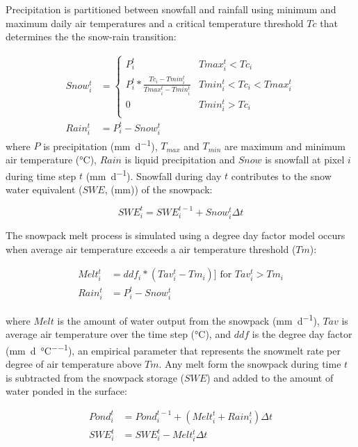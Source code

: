 Precipitation is partitioned between snowfall and rainfall using minimum and maximum daily air temperatures and a critical temperature threshold $Tc$ that determines the the snow-rain transition:

\begin{align}
Snow_i^t &= \left\{
        \begin{array}{ll}
        P_i^t &  Tmax_i^t < Tc_i \\  
        P_i^t * \frac{Tc_i - Tmin_i^t}{Tmax_i^t - Tmin_i^t} & Tmin_i^t < Tc_i < Tmax_i^t \\
        0 &  Tmin_i^t > Tc_i \\
        \end{array}
\right.\\
Rain_i^t &= P_i^t - Snow_i^t     
\end{align}
\noindent where $P$ is precipitation (\si{\milli\metre\per\day}), $T_{max}$ and $T_{min}$ are maximum and minimum air temperature (\si{\degreeCelsius}), $Rain$ is liquid precipitation and $Snow$ is snowfall at pixel $i$ during time step $t$ (\si{\milli\metre\per\day}). Snowfall during day $t$ contributes to the snow water equivalent ($SWE$, (\si{\milli\metre})) of the snowpack:

\begin{equation}
SWE_i^t = SWE_i^{t-1} + Snow_i^t \Delta t
\end{equation}

The snowpack melt process is simulated using a degree day factor model occurs when average air temperature exceeds a air temperature threshold ($Tm$):

\begin{align}
Melt_i^t &= ddf_i * (Tav_i^t - Tm_i)  ]\text{ for } Tav_i^t > Tm_i \\
Rain_i^t &= P_i^t - Snow_i^t     
\end{align}

\noindent where $Melt$ is the amount of water output from the snowpack (\si{\milli\metre\per\day}), $Tav$ is average air temperature over the time step (\si{\degreeCelsius}), and $ddf$ is the degree day factor (\si{\milli\metre\per\day\per\degreeCelsius}), an empirical parameter that represents the snowmelt rate per degree of air temperature above $Tm$. Any melt form the snowpack during time $t$ is subtracted from the snowpack storage ($SWE$) and added to the amount of water ponded in the surface:

\begin{align}
Pond_i^t &= Pond_i^{t-1} + (Melt_i^t + Rain_i^t)\Delta t \\
SWE_i^t &= SWE_i^t - Melt_i^t \Delta t   
\end{align}

